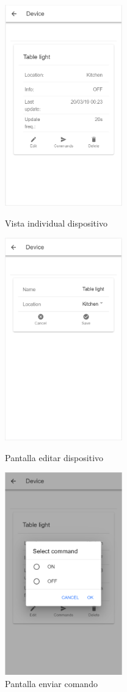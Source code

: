 \begin{figure}[!htb]
\includegraphics[width=2.00in]{images/screens/device_screen.PNG}
\caption{Vista individual dispositivo}
\label{fig:pantalla_dispositivo}
\endminipage\hfill
{}
\includegraphics[width=2.00in]{images/screens/edit_device_screen.PNG}
\caption{Pantalla editar dispositivo}
\label{fig:pantalla_editar}
\endminipage\hfill
{}%
\includegraphics[width=2.00in]{images/screens/send_command.PNG}
\caption{Pantalla enviar comando}
\label{fig:pantalla_comando}
\endminipage
\end{figure}

